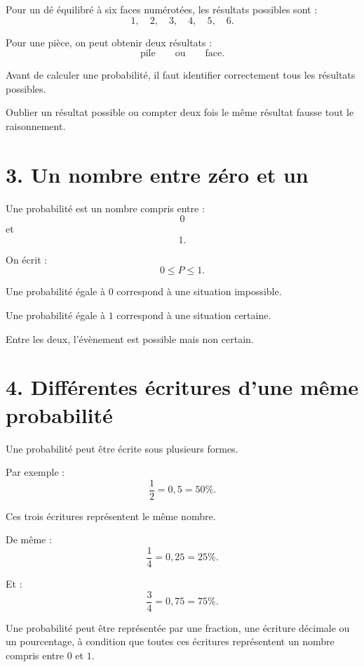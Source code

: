 Pour un dé équilibré à six faces numérotées, les résultats possibles sont :
\[
1,\quad2,\quad3,\quad4,\quad5,\quad6.
\]

Pour une pièce, on peut obtenir deux résultats :
\[
\text{pile}\qquad\text{ou}\qquad\text{face}.
\]

Avant de calculer une probabilité, il faut identifier correctement tous les résultats possibles.

\begin{attention}
Oublier un résultat possible ou compter deux fois le même résultat fausse tout le raisonnement.
\end{attention}

\section{3. Un nombre entre zéro et un}

Une probabilité est un nombre compris entre :
\[
0
\]
et
\[
1.
\]

On écrit :
\[
\boxed{0\le P\le1}.
\]

Une probabilité égale à $0$ correspond à une situation impossible.

Une probabilité égale à $1$ correspond à une situation certaine.

Entre les deux, l'évènement est possible mais non certain.


\section{4. Différentes écritures d'une même probabilité}

Une probabilité peut être écrite sous plusieurs formes.

Par exemple :
\[
\dfrac12=0{,}5=50\%.
\]

Ces trois écritures représentent le même nombre.

De même :
\[
\dfrac14=0{,}25=25\%.
\]

Et :
\[
\dfrac34=0{,}75=75\%.
\]

\begin{propriete}
Une probabilité peut être représentée par une fraction, une écriture décimale ou un pourcentage, à condition que toutes ces écritures représentent un nombre compris entre $0$ et $1$.
\end{propriete}


